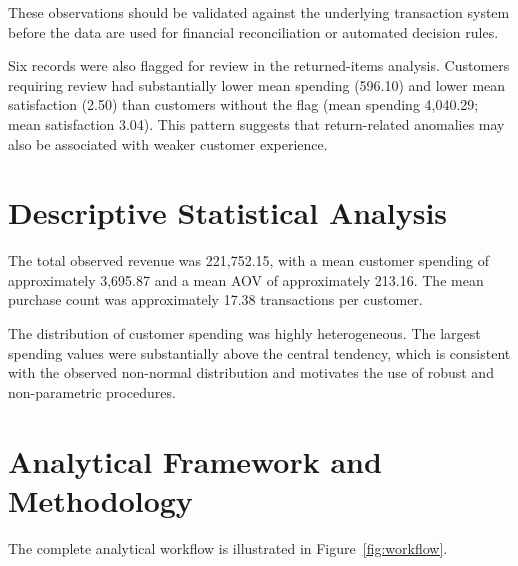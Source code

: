 \documentclass[11pt,a4paper]{article}
\begin{document}
These observations should be validated against the underlying transaction
system before the data are used for financial reconciliation or automated
decision rules.

Six records were also flagged for review in the returned-items analysis.
Customers requiring review had substantially lower mean spending
(596.10) and lower mean satisfaction (2.50) than customers without the
flag (mean spending 4,040.29; mean satisfaction 3.04). This pattern
suggests that return-related anomalies may also be associated with weaker
customer experience.


\section{Descriptive Statistical Analysis}

The total observed revenue was 221,752.15, with a mean customer spending
of approximately 3,695.87 and a mean AOV of approximately 213.16.
The mean purchase count was approximately 17.38 transactions per customer.

The distribution of customer spending was highly heterogeneous. The
largest spending values were substantially above the central tendency,
which is consistent with the observed non-normal distribution and
motivates the use of robust and non-parametric procedures.

\section{Analytical Framework and Methodology}

The complete analytical workflow is illustrated in Figure~\ref{fig:workflow}.
\end{document}
